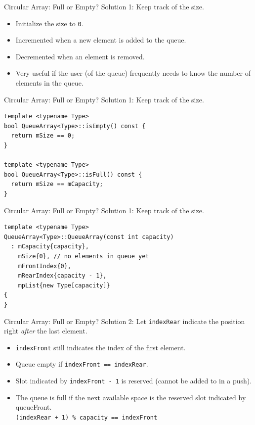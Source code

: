 \documentclass[14pt,aspectratio=1610]{beamer}
\begin{document}
\begin{frame}{Circular Array: Full or Empty?}
  Solution 1: Keep track of the size.
  \begin{itemize}
    \item Initialize the size to \texttt{0}.
    \item Incremented when a new element is added to the queue.
    \item Decremented when an element is removed.
    \item Very useful if the user (of the queue) frequently needs to know the number of elements in the queue.
  \end{itemize}
\end{frame}

\begin{frame}[fragile]{Circular Array: Full or Empty?}
  Solution 1: Keep track of the size.
  
\begin{lstlisting}
template <typename Type>
bool QueueArray<Type>::isEmpty() const {
  return mSize == 0;
}

template <typename Type>
bool QueueArray<Type>::isFull() const {
  return mSize == mCapacity;
}
\end{lstlisting}
\end{frame}

\begin{frame}[fragile]{Circular Array: Full or Empty?}
  Solution 1: Keep track of the size.
  
\begin{lstlisting}
template <typename Type>
QueueArray<Type>::QueueArray(const int capacity)
  : mCapacity{capacity},
    mSize{0}, // no elements in queue yet
    mFrontIndex{0},
    mRearIndex{capacity - 1},
    mpList{new Type[capacity]}
{
}
\end{lstlisting}
\end{frame}

\begin{frame}[fragile]{Circular Array: Full or Empty?}
  Solution 2: Let \lstinline{indexRear} indicate the position right \textit{after} the last element.
  \begin{itemize}
    \item \lstinline{indexFront} still indicates the index of the first element.
    \item Queue empty if \lstinline{indexFront == indexRear}.
    \item Slot indicated by \lstinline{indexFront - 1} is reserved (cannot be added to in a push).
    \item The queue is full if the next available space is the reserved slot indicated by queueFront.\\
      \lstinline{(indexRear + 1) % capacity == indexFront}
  \end{itemize}
\end{frame}
\end{document}
